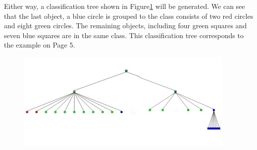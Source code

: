 Either way, a classification tree shown in Figure\ref{Fig:testsuite} will be generated. We can see that the last object, a blue circle is grouped to the class consists of two red circles and eight green circles. The remaining objects, including four green squares and seven blue squares are in the same class. This classification tree corresponds to the example on Page 5. 
\begin{figure}[h!]
    \centering
    \includegraphics[width=300pt]{../images/testsuite.jpg}
    \caption{}
    \label{Fig:testsuite}
	\end{figure}